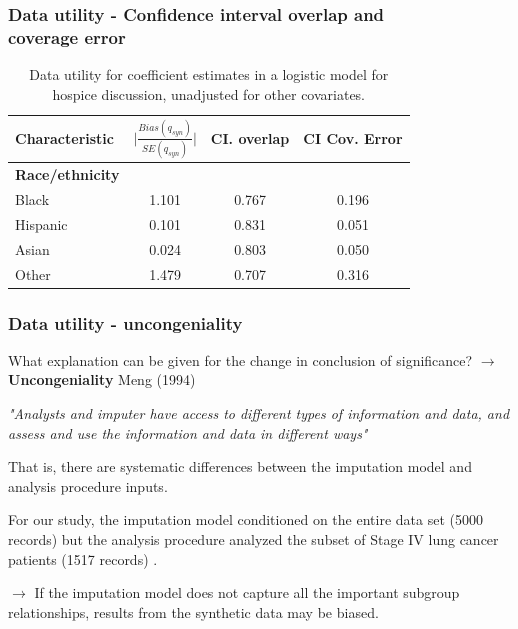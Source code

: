 \documentclass[11pt,handout]{beamer}
\begin{document}
\begin{frame}
\frametitle{Data utility - Confidence interval overlap and \\ coverage error}
\begin{table}
\caption{{\large Data utility for coefficient estimates in a logistic model for hospice discussion, unadjusted for other covariates.}}
\begin{center}
\begin{tabular}{ l|cc|c} \hline 
 \textbf{Characteristic} & \textrm{$\Big|\frac{Bias({q_{syn}})}{SE(q_{syn})} \Big |$} &  \textbf{CI. overlap}  & \textbf{CI Cov. Error}  \\ \hline
 \textbf{Race/ethnicity}  & &  &\\
      Black & 1.101 &  \cellcolor[gray]{0.8} 0.767  &  \cellcolor[gray]{0.8} 0.196 \\
       Hispanic &  0.101 & 0.831 & 0.051 \\
       Asian &  0.024 & 0.803 & 0.050 \\
       Other & 1.479 & 0.707  & 0.316 \\ \hline
\end{tabular}
\label{haiden_mult_c}
\end{center}
\end{table}

\end{frame}



\begin{frame}
\frametitle{Data utility - uncongeniality}

What explanation can be given for the change in conclusion of significance?  $\rightarrow$ \textbf{Uncongeniality} Meng (1994)

\smallskip

\begin{center}
\textit{"Analysts and imputer have access to different types of information and data, and assess and use the information and data in different ways"}
\end{center}
\bigskip

That is, there are systematic differences between the imputation model and analysis procedure inputs.

\smallskip

For our study, the imputation model conditioned on the entire data set (5000 records) but the analysis procedure analyzed the subset of Stage IV lung cancer patients (1517 records) .


\smallskip

$\rightarrow$ If the imputation model does not capture all the important subgroup relationships, results from the synthetic data may
be biased.

\end{frame}
\end{document}
